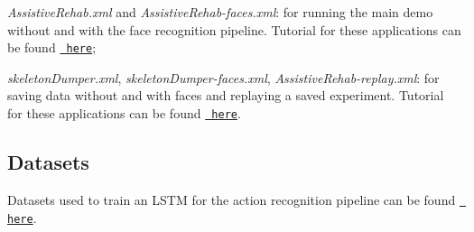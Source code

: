 \begin{DoxyItemize}
\item {\itshape Assistive\+Rehab.\+xml} and {\itshape Assistive\+Rehab-\/faces.\+xml}\+: for running the main demo without and with the face recognition pipeline. Tutorial for these applications can be found \href{https://robotology.github.io/assistive-rehab/doc/mkdocs/site/main_apps/}{\texttt{ here}};
\item {\itshape skeleton\+Dumper.\+xml}, {\itshape skeleton\+Dumper-\/faces.\+xml}, {\itshape Assistive\+Rehab-\/replay.\+xml}\+: for saving data without and with faces and replaying a saved experiment. Tutorial for these applications can be found \href{https://robotology.github.io/assistive-rehab/doc/mkdocs/site/replay_an_experiment/}{\texttt{ here}}.
\end{DoxyItemize}

\subsection*{Datasets}

Datasets used to train an L\+S\+TM for the action recognition pipeline can be found \href{https://github.com/robotology/assistive-rehab-storage}{\texttt{ here}}. 